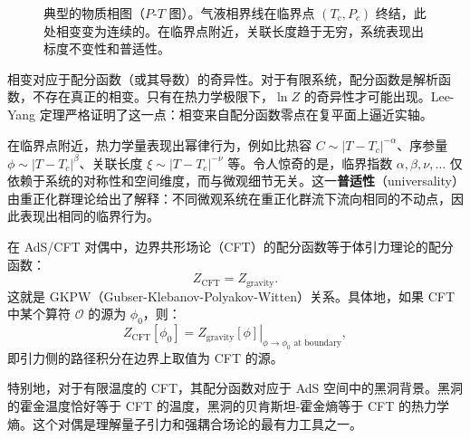 \begin{figure}[htbp]
\centering
{}
\caption{典型的物质相图（$P$-$T$ 图）。气液相界线在临界点 $(T_c, P_c)$ 终结，此处相变变为连续的。在临界点附近，关联长度趋于无穷，系统表现出标度不变性和普适性\cite{Wilson1974}。}
\label{fig:phase_diagram}
\end{figure}

\begin{remark}[配分函数与相变]
相变对应于配分函数（或其导数）的奇异性。对于有限系统，配分函数是解析函数，不存在真正的相变。只有在热力学极限下，$\ln Z$ 的奇异性才可能出现。Lee-Yang 定理严格证明了这一点：相变来自配分函数零点在复平面上逼近实轴。
\end{remark}

\begin{remark}[临界指数与普适性]
在临界点附近，热力学量表现出幂律行为，例如比热容 $C \sim |T - T_c|^{-\alpha}$、序参量 $\phi \sim |T - T_c|^{\beta}$、关联长度 $\xi \sim |T - T_c|^{-\nu}$ 等。令人惊奇的是，临界指数 $\alpha, \beta, \nu, \ldots$ 仅依赖于系统的对称性和空间维度，而与微观细节无关。这一\textbf{普适性}（universality）由重正化群理论给出了解释\cite{Wilson1974}：不同微观系统在重正化群流下流向相同的不动点，因此表现出相同的临界行为。
\end{remark}

\begin{remark}[全息原理与配分函数]
在 AdS/CFT 对偶\cite{Maldacena1997}中，边界共形场论（CFT）的配分函数等于体引力理论的配分函数：
\begin{equation}
    Z_{\text{CFT}} = Z_{\text{gravity}}.
\end{equation}
这就是 GKPW（Gubser-Klebanov-Polyakov-Witten）关系。具体地，如果 CFT 中某个算符 $\mathcal{O}$ 的源为 $\phi_0$，则：
\begin{equation}
    Z_{\text{CFT}}[\phi_0] = \left. Z_{\text{gravity}}[\phi]
\right|_{\phi \to \phi_0 \text{ at boundary}},
\end{equation}
即引力侧的路径积分在边界上取值为 CFT 的源。

特别地，对于有限温度的 CFT，其配分函数对应于 AdS 空间中的黑洞背景\cite{Hawking1983}。黑洞的霍金温度恰好等于 CFT 的温度，黑洞的贝肯斯坦-霍金熵等于 CFT 的热力学熵。这个对偶是理解量子引力和强耦合场论的最有力工具之一。
\end{remark}

